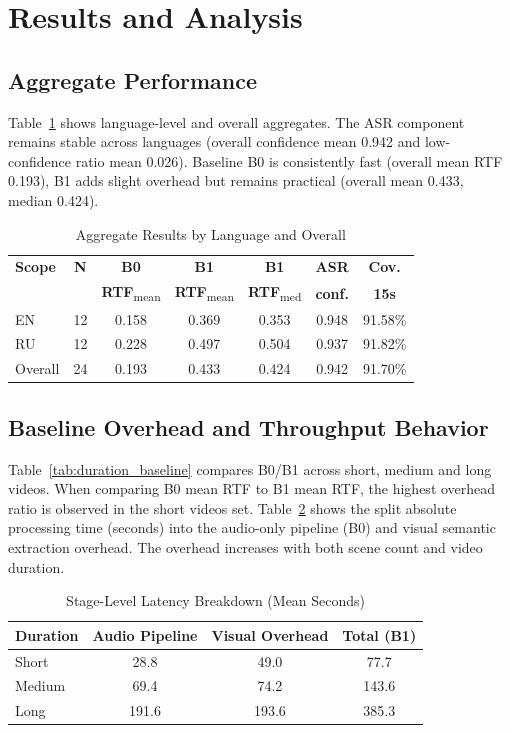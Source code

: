 ﻿\documentclass[conference]{IEEEtran}
\begin{document}
\FloatBarrier
\section{Results and Analysis}
\subsection{Aggregate Performance}
Table~\ref{tab:lang_overall} shows language-level and overall aggregates. The ASR component remains stable across languages (overall confidence mean 0.942 and low-confidence ratio mean 0.026). Baseline B0 is consistently fast (overall mean RTF 0.193), B1 adds slight overhead but remains practical (overall mean 0.433, median 0.424).

\begin{table}[t]
\caption{Aggregate Results by Language and Overall}
\label{tab:lang_overall}
\centering
\footnotesize
\setlength{\tabcolsep}{4.2pt}
\begin{tabular}{lcccccc}
\toprule
\textbf{Scope} & \textbf{N} & \textbf{B0} & \textbf{B1} & \textbf{B1} & \textbf{ASR} & \textbf{Cov.} \\
 &  & \textbf{RTF}\textsubscript{mean} & \textbf{RTF}\textsubscript{mean} & \textbf{RTF}\textsubscript{med} & \textbf{conf.} & \textbf{15s} \\
\midrule
EN & 12 & 0.158 & 0.369 & 0.353 & 0.948 & 91.58\% \\
RU & 12 & 0.228 & 0.497 & 0.504 & 0.937 & 91.82\% \\
Overall & 24 & 0.193 & 0.433 & 0.424 & 0.942 & 91.70\% \\
\bottomrule
\end{tabular}
\end{table}

\subsection{Baseline Overhead and Throughput Behavior}
Table~\ref{tab:duration_baseline} compares B0/B1 across short, medium and long videos. When comparing B0 mean RTF to B1 mean RTF, the highest overhead ratio is observed in the short videos set. Table~\ref{tab:stage_latency} shows the split absolute processing time (seconds) into the audio-only pipeline (B0) and visual semantic extraction overhead. The overhead increases with both scene count and video duration.

\begin{table}[t]
\caption{Stage-Level Latency Breakdown (Mean Seconds)}
\label{tab:stage_latency}
\centering
\footnotesize
\setlength{\tabcolsep}{5pt}
\begin{tabular}{lccc}
\toprule
\textbf{Duration} & \textbf{Audio Pipeline} & \textbf{Visual Overhead} & \textbf{Total (B1)} \\
\midrule
Short & 28.8 & 49.0 & 77.7 \\
Medium & 69.4 & 74.2 & 143.6 \\
Long & 191.6 & 193.6 & 385.3 \\
\bottomrule
\end{tabular}
\end{table}
\end{document}
